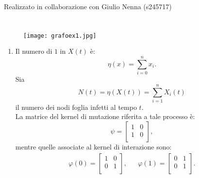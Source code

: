 \documentclass[11pt,largemargins]{homework}
\begin{document}
\maketitle
\begin{center}
Realizzato in collaborazione con Giulio Nenna (s245717)
\end{center}
\section{}%
  \begin{figure}[htb]\centering
\texttt{[image: grafoex1.jpg]}
  \end{figure}
  
    
    
  \begin{enumerate}
 
  
    \item
     Il numero di $1$ in $X(t)$ è:
     \begin{equation*}
     \eta\left(x\right)= \sum_{i=0}^{n}x_{i}.
     \end{equation*}
    Sia 
    \begin{equation*}
    N\left(t\right)=\eta\left(X\left(t\right)\right)=\sum_{i=1}^{n}X_{i}\left(t\right)
    \end{equation*}
     il numero dei nodi foglia infetti al tempo $t$.\\
     La matrice del kernel di mutazione riferita a tale processo è:
    \begin{equation*}
      \psi=
      \begin{bmatrix}
        1 & 0  \\
        1 & 0  \\
      \end{bmatrix},
      \end{equation*}
  mentre quelle associate al kernel di interazione sono:
   \begin{align*}
      \varphi\left(0\right)=\begin{bmatrix}
        1 & 0\\
        0 & 1 \\ 
      \end{bmatrix}, &&  
      \varphi\left(1\right)=\begin{bmatrix}
         0 & 1\\
        0 & 1 \\ 
      \end{bmatrix}.
    \end{align*}
    

\end{enumerate}
\end{document}
